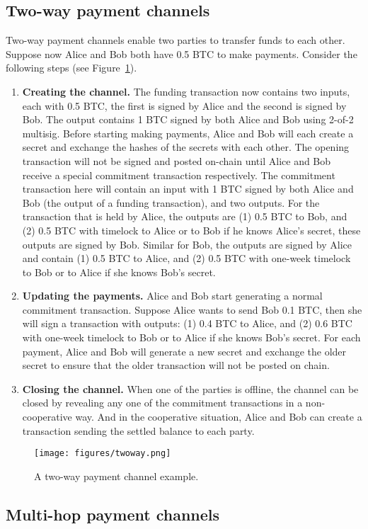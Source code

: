 \documentclass{article}
\begin{document}
\subsection*{Two-way payment channels}
Two-way payment channels enable two parties to transfer funds to each other. Suppose now Alice and Bob both have 0.5 BTC to make payments. Consider the following steps (see Figure~\ref{fig:2channel}). 
\begin{enumerate}
    \item \textbf{Creating the channel.} The funding transaction now contains two inputs, each with 0.5 BTC, the first is signed by Alice and the second is signed by Bob. The output contains 1 BTC signed by both Alice and Bob using 2-of-2 {\sf multisig}. Before starting making payments, Alice and Bob will each create a secret and exchange the hashes of the secrets with each other.  The opening transaction will not be signed and posted on-chain until Alice and Bob receive a special commitment transaction respectively. The commitment transaction  here will contain an input with 1 BTC signed by both Alice and Bob (the output of a funding transaction), and two outputs. For the transaction that is held by Alice, the outputs are (1) 0.5 BTC to Bob, and (2) 0.5 BTC with timelock to Alice or to Bob if he knows Alice's secret, these outputs are signed by Bob. Similar for Bob, the outputs are signed by Alice and contain (1) 0.5 BTC to Alice, and (2) 0.5 BTC with one-week timelock to Bob or to Alice if she knows Bob's secret.
    \item \textbf{Updating the payments.} Alice and Bob start generating a normal commitment transaction. Suppose Alice wants to send Bob 0.1 BTC, then she will sign a transaction with outputs: (1) 0.4 BTC to Alice, and (2) 0.6 BTC with one-week timelock to Bob or to Alice if she knows Bob's secret. For each payment, Alice and Bob will generate a new secret and exchange the older secret to ensure that the older transaction will not be posted on chain.
    \item \textbf{Closing the channel.} When one of the parties is offline, the channel can be closed by revealing any one of the commitment transactions in a non-cooperative way. And in the cooperative situation, Alice and Bob can create a transaction sending the settled balance to each party.

\end{enumerate}




\begin{figure}
    \centering
    \texttt{[image: figures/twoway.png]}
    \caption{A two-way payment channel example.}
    \label{fig:2channel}
\end{figure}


\subsection*{Multi-hop payment channels}
\end{document}
